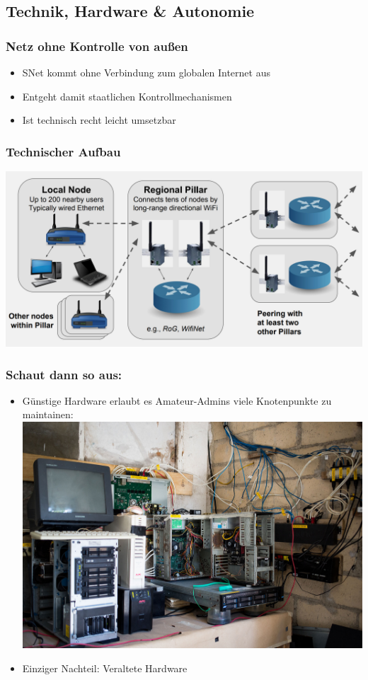 \subsection{Technik, Hardware \& Autonomie}

\begin{frame}
\frametitle{Netz ohne Kontrolle von außen}
	\begin{itemize}
		\item SNet kommt ohne Verbindung zum globalen Internet aus
		\item Entgeht damit staatlichen Kontrollmechanismen
		\item Ist technisch recht leicht umsetzbar
	\end{itemize}
	
\end{frame}
\begin{frame}
	\frametitle{Technischer Aufbau}
	\includegraphics[width=\textwidth]{images/snet_tech.jpg}
\end{frame}	
\begin{frame}
\frametitle{Schaut dann so aus:}
	\begin{itemize}
		\item Günstige Hardware erlaubt es Amateur-Admins viele Knotenpunkte zu maintainen:
			\includegraphics[width=\textwidth]{images/snet_pillar.jpg}
		\item Einziger Nachteil: Veraltete Hardware
	\end{itemize}
\end{frame}

